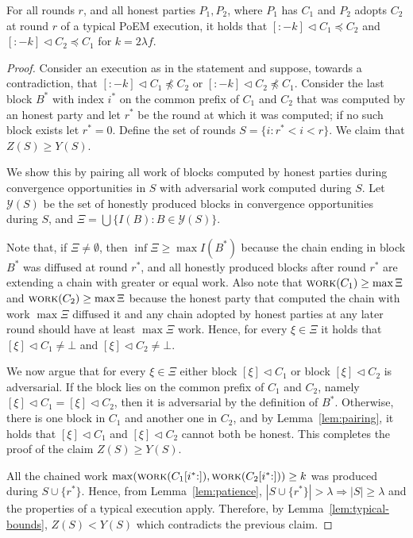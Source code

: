 \begin{lemma} \label{lem:common-prefix-lemma}
  For all rounds $r$, and all honest parties $P_1, P_2$, where $P_1$ has $C_1$ and $P_2$ adopts $C_2$ at round $r$
  of a typical PoEM execution, it holds that $[{:}{-k}] \lhd C_1 \preccurlyeq C_2$ and $[{:}{-k}] \lhd C_2 \preccurlyeq C_1$
  for $k = 2 \lambda f$. 
\end{lemma}
\begin{proof}
  Consider an execution as in the statement and suppose,
  towards a contradiction, that $[{:}{-k}] \lhd C_1 \not \preccurlyeq C_2$
  or $[{:}{-k}] \lhd C_2 \not \preccurlyeq C_1$.
  Consider the last block $B^*$ with index $i^*$ on the common prefix of
  $C_1$ and $C_2$ that was computed by an honest party and let $r^*$
  be the round at which it was computed; if no such block exists let $r^* = 0$.
  Define the set of rounds $S = \{i: r^* < i < r\}$. We claim that
  $Z(S) \geq Y(S)$.

  We show this by pairing all work of blocks computed by honest parties during
  convergence opportunities in $S$ with adversarial work computed during $S$.
  Let $\mathcal{Y}(S)$ be the set of honestly produced blocks in convergence opportunities
  during $S$, and $\Xi = \bigcup \{I(B): B \in \mathcal{Y}(S)\}$.

  Note that, if $\Xi \neq \emptyset$, then $\inf{\Xi} \geq \max{I(B^*)}$
  because the chain ending in block $B^*$
  was diffused at round $r^*$, and all honestly produced blocks after round $r^*$
  are extending a chain with greater or equal work.
  Also note that $\textsc{work}(C_1) \geq \max{\Xi}$ and $\textsc{work}(C_2) \geq \max{\Xi}$ because
  the honest party that computed the chain with work $\max \Xi$ diffused it and any chain adopted
  by honest parties at any later round should have at least $\max \Xi$ work. 
  Hence, for every $\xi \in \Xi$ it holds that
  $[\xi] \lhd C_1 \neq \bot$ and $[\xi] \lhd C_2 \neq \bot$.

  We now argue that for every $\xi \in \Xi$ either block $[\xi] \lhd C_1$
  or block $[\xi] \lhd C_2$ is adversarial. If the block lies on the
  common prefix of $C_1$ and $C_2$, namely $[\xi] \lhd C_1 = [\xi] \lhd C_2$,
  then it is adversarial by the definition of $B^*$. Otherwise,
  there is one block in $C_1$ and another one in $C_2$, and by
  Lemma~\ref{lem:pairing}, it holds that $[\xi] \lhd C_1$ and
  $[\xi] \lhd C_2$ cannot both be honest.
  This completes the proof of the claim $Z(S) \geq Y(S)$.

  All the chained work $\max(\textsc{work}(C_1[{i^*} {:}]), \textsc{work}(C_2[{i^*} {:}])) \geq k$
  was produced during $S \cup \{r^*\}$.
  Hence, from Lemma~\ref{lem:patience}, $|S \cup \{r^*\}| > \lambda \Rightarrow |S| \geq \lambda$ and
  the properties of a typical execution apply.
  Therefore, by Lemma~\ref{lem:typical-bounds},
  $Z(S) < Y(S)$ which contradicts the previous claim. \Qed
\end{proof}

